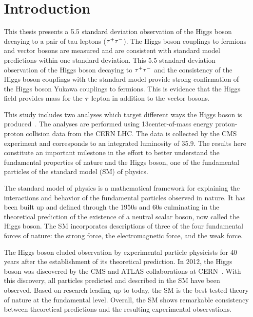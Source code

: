 \chapter{Introduction}
\label{sec:introduction}

This thesis presents a 5.5 standard deviation observation of the Higgs boson decaying to a pair
of tau leptons ($\tau^{+}\tau^{-}$). 
The Higgs boson couplings to fermions and vector bosons are measured and are 
consistent with standard model predictions within one standard deviation.
This 5.5 standard deviation observation of the Higgs boson decaying to $\tau^{+}\tau^{-}$ and the consistency
of the Higgs boson couplings with the standard model provide strong confirmation of the Higgs boson
Yukawa couplings to fermions.
This is evidence that the Higgs field provides mass
for the $\tau$ lepton in addition to the vector bosons.

This study includes two analyses which target different
ways the Higgs boson is produced~\cite{cms_13TeV_htt_jhep_2017, HIG-18-007}. The analyses are performed using
13\TeV center-of-mass energy proton-proton collision data from the CERN LHC.
The data is collected by the CMS experiment and corresponds to an integrated
luminosity of 35.9\fbinv. The results here constitute an important
milestone in the effort to better understand the fundamental properties of nature and
the Higgs boson, one of the fundamental particles of the standard model (SM) of physics.

The standard model of physics is a mathematical framework for explaining
the interactions and behavior of the fundamental particles observed in nature.
It has been built up and defined through the 1950s and 60s culminating in the
theoretical prediction of the existence of a neutral scalar boson, now called the
Higgs boson.
The SM incorporates descriptions of three of the four fundamental forces of nature:
the strong force, the electromagnetic force, and the weak force.

The Higgs boson eluded observation by experimental particle physicists
for 40 years after the establishment of its theoretical prediction. 
In 2012, the Higgs boson was discovered 
by the CMS and ATLAS collaborations at CERN~\cite{Aad:2012tfa, Chatrchyan:2012xdj, Chatrchyan:2013lba}.
With this discovery, all particles predicted and described in the SM have been observed.
Based on research leading up to today, the SM is the best tested theory of nature at the fundamental level.
Overall, the SM shows remarkable consistency between theoretical predictions and
the resulting experimental observations.

